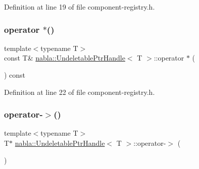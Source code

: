 Definition at line 19 of file component-\/registry.\+h.

\mbox{\label{structnabla_1_1_undeletable_ptr_handle_a1cce9ea2ea5c3cb103f59c335267e7e7}} 
\subsubsection{\texorpdfstring{operator $\ast$()}{operator *()}\hspace{0.1cm}{\footnotesize\ttfamily [2/2]}}
{\footnotesize\ttfamily template$<$typename T$>$ \\
const T\& \mbox{\hyperlink{structnabla_1_1_undeletable_ptr_handle}{nabla\+::\+Undeletable\+Ptr\+Handle}}$<$ T $>$\+::operator $\ast$ (\begin{DoxyParamCaption}{ }\end{DoxyParamCaption}) const\hspace{0.3cm}{\ttfamily [inline]}}



Definition at line 22 of file component-\/registry.\+h.

\mbox{\label{structnabla_1_1_undeletable_ptr_handle_ac8a3d97fd2186ea1d1c48041dc4fedcf}} 
\subsubsection{\texorpdfstring{operator-\/$>$()}{operator->()}\hspace{0.1cm}{\footnotesize\ttfamily [1/2]}}
{\footnotesize\ttfamily template$<$typename T$>$ \\
T$\ast$ \mbox{\hyperlink{structnabla_1_1_undeletable_ptr_handle}{nabla\+::\+Undeletable\+Ptr\+Handle}}$<$ T $>$\+::operator-\/$>$ (\begin{DoxyParamCaption}{ }\end{DoxyParamCaption})\hspace{0.3cm}{\ttfamily [inline]}}



